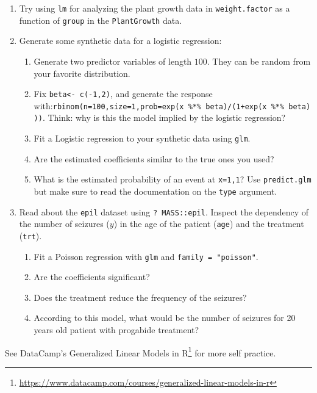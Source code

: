 \documentclass[]{book}
\providecommand{\tightlist}{%
  \setlength{\itemsep}{0pt}\setlength{\parskip}{0pt}}
\renewcommand{\href}[2]{#2\footnote{\url{#1}}}
\theoremstyle{definition}
\theoremstyle{definition}
\theoremstyle{definition}
\theoremstyle{remark}
\begin{document}
\begin{enumerate}
\def\labelenumi{\arabic{enumi}.}
\item
  Try using \texttt{lm} for analyzing the plant growth data in \texttt{weight.factor} as a function of \texttt{group} in the \texttt{PlantGrowth} data.
\item
  Generate some synthetic data for a logistic regression:

  \begin{enumerate}
  \def\labelenumii{\alph{enumii}.}
  \tightlist
  \item
    Generate two predictor variables of length \(100\). They can be random from your favorite distribution.
  \item
    Fix \texttt{beta\textless{}-\ c(-1,2)}, and generate the response with:\texttt{rbinom(n=100,size=1,prob=exp(x\ \%*\%\ beta)/(1+exp(x\ \%*\%\ beta)))}. Think: why is this the model implied by the logistic regression?
  \item
    Fit a Logistic regression to your synthetic data using \texttt{glm}.
  \item
    Are the estimated coefficients similar to the true ones you used?
  \item
    What is the estimated probability of an event at \texttt{x=1,1}? Use \texttt{predict.glm} but make sure to read the documentation on the \texttt{type} argument.
  \end{enumerate}
\item
  Read about the \texttt{epil} dataset using \texttt{?\ MASS::epil}. Inspect the dependency of the number of seizures (\(y\)) in the age of the patient (\texttt{age}) and the treatment (\texttt{trt}).

  \begin{enumerate}
  \def\labelenumii{\arabic{enumii}.}
  \tightlist
  \item
    Fit a Poisson regression with \texttt{glm} and \texttt{family\ =\ "poisson"}.
  \item
    Are the coefficients significant?\\
  \item
    Does the treatment reduce the frequency of the seizures?
  \item
    According to this model, what would be the number of seizures for 20 years old patient with progabide treatment?
  \end{enumerate}
\end{enumerate}

See DataCamp's \href{https://www.datacamp.com/courses/generalized-linear-models-in-r}{Generalized Linear Models in R} for more self practice.
\end{document}
